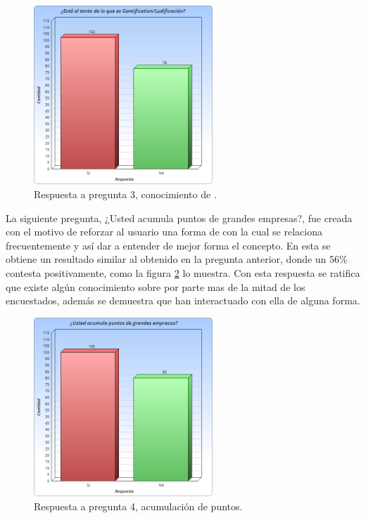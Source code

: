 \begin{figure}[!htb]
    \centering
    \includegraphics[width=0.6\textwidth]{images/Graficos/graf_5_1.png}
    \caption[chart5.1]{Respuesta a pregunta $3$, conocimiento de {\GAM}.}
    \label{fig:chart5.1}
\end{figure}

La siguiente pregunta,
¿Usted acumula puntos de grandes empresas?, fue creada con el motivo de reforzar
al usuario una forma de {\GAM} con la cual se relaciona frecuentemente y así dar
a entender de mejor forma el concepto.
En esta se obtiene un resultado similar al obtenido en la pregunta anterior,
donde un 56\% contesta positivamente, como la figura  \ref{fig:chart5.2} lo muestra.
Con esta respuesta se ratifica que existe algún conocimiento sobre {\GAM} por parte
mas de la mitad de los encuestados, además se demuestra que han interactuado con
ella de alguna forma.

\begin{figure}[!htb]
    \centering
    \includegraphics[width=0.6\textwidth]{images/Graficos/graf_5_2.png}
    \caption[chart5.2]{Respuesta a pregunta 4, acumulación de puntos.}
    \label{fig:chart5.2}
\end{figure}

